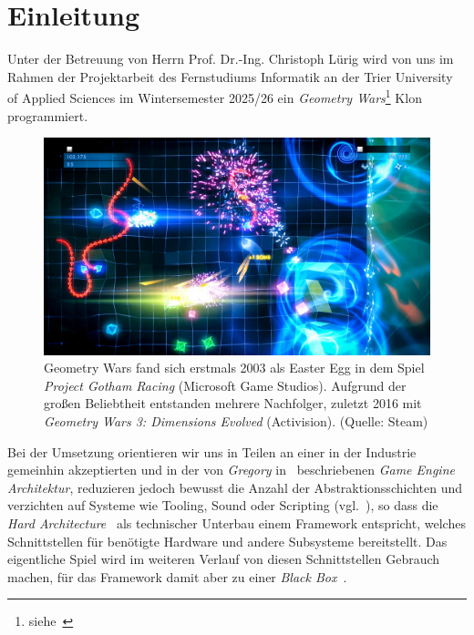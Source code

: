 \section{Einleitung}

Unter der Betreuung von Herrn Prof. Dr.-Ing. Christoph Lürig wird von uns im Rahmen der Projektarbeit des Fernstudiums Informatik an der Trier University of Applied Sciences im Wintersemester 2025/26 ein \textit{Geometry Wars}\footnote{siehe~\cite[]{WikipediaGeometryWars}
} Klon programmiert.\\

\begin{figure}[!h]
    \centering
    \includegraphics[width=1\columnwidth]{img/geometry_wars}
    \caption{Geometry Wars fand sich erstmals 2003 als Easter Egg in dem Spiel \textit{Project Gotham Racing} (Microsoft Game Studios). Aufgrund der großen Beliebtheit entstanden mehrere Nachfolger, zuletzt 2016 mit \textit{Geometry Wars 3: Dimensions Evolved} (Activision). (Quelle: Steam)}
    \label{fig:geometry_wars}
\end{figure}

Bei der Umsetzung orientieren wir uns in Teilen an einer in der Industrie gemeinhin akzeptierten und in der von \textit{Gregory} in~\cite[]{Gre19} beschriebenen \textit{Game Engine Architektur}, reduzieren jedoch bewusst die Anzahl der Abstraktionsschichten und verzichten auf Systeme wie Tooling, Sound oder Scripting (vgl.~\cite[\textbf{Figure 1.16}, 39]{Gre19}), so dass die \textit{Hard Architecture}~\cite[]{RM04} als technischer Unterbau einem Framework entspricht, welches Schnittstellen für benötigte Hardware und andere Subsysteme bereitstellt.
Das eigentliche Spiel wird im weiteren Verlauf von diesen Schnittstellen Gebrauch machen, für das Framework damit aber zu einer \textit{Black Box}~\cite[]{RB88}.\\

